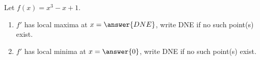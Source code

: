 \documentclass{ximera}
\author{Gregory Hartman \and Matthew Carr}
\begin{document}
\begin{exercise}






Let $f(x)=x^3-x+1$.
\begin{enumerate}
\item		$f'$ has local maxima at $x=\answer{DNE}$, write DNE if no such point(s) exist.
\item		$f'$ has local minima at $x=\answer{0}$, write DNE if no such point(s) exist.
\end{enumerate}

\end{exercise}
\end{document}
